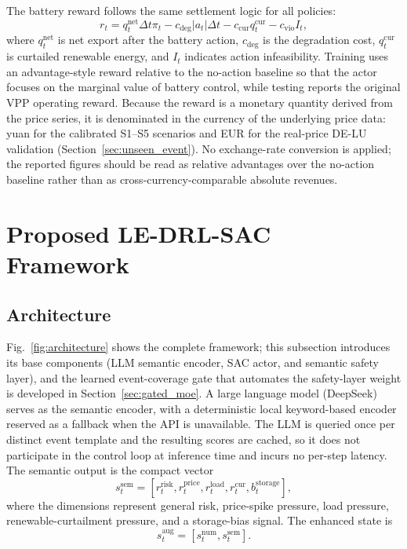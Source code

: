 \documentclass{ieeeaccess}
\begin{document}
The battery reward follows the same settlement logic for all policies:
\begin{equation}
r_t = q^{\mathrm{net}}_t \Delta t \pi_t
- c_{\mathrm{deg}} |a_t| \Delta t
- c_{\mathrm{cur}} q^{\mathrm{cur}}_t
- c_{\mathrm{vio}} I_t ,
\end{equation}
where $q^{\mathrm{net}}_t$ is net export after the battery action, $c_{\mathrm{deg}}$ is the degradation cost, $q^{\mathrm{cur}}_t$ is curtailed renewable energy, and $I_t$ indicates action infeasibility. Training uses an advantage-style reward relative to the no-action baseline so that the actor focuses on the marginal value of battery control, while testing reports the original VPP operating reward. Because the reward is a monetary quantity derived from the price series, it is denominated in the currency of the underlying price data: yuan for the calibrated S1--S5 scenarios and EUR for the real-price DE-LU validation (Section~\ref{sec:unseen_event}). No exchange-rate conversion is applied; the reported figures should be read as relative advantages over the no-action baseline rather than as cross-currency-comparable absolute revenues.

\section{Proposed LE-DRL-SAC Framework}
\label{sec:method}

\subsection{Architecture}
Fig.~\ref{fig:architecture} shows the complete framework; this subsection introduces its base components (LLM semantic encoder, SAC actor, and semantic safety layer), and the learned event-coverage gate that automates the safety-layer weight is developed in Section~\ref{sec:gated_moe}. A large language model (DeepSeek) serves as the semantic encoder, with a deterministic local keyword-based encoder reserved as a fallback when the API is unavailable. The LLM is queried once per distinct event template and the resulting scores are cached, so it does not participate in the control loop at inference time and incurs no per-step latency. The semantic output is the compact vector
\begin{equation}
s^{\mathrm{sem}}_t =
[r_t^{\mathrm{risk}}, r_t^{\mathrm{price}}, r_t^{\mathrm{load}},
r_t^{\mathrm{cur}}, b_t^{\mathrm{storage}}],
\end{equation}
where the dimensions represent general risk, price-spike pressure, load pressure, renewable-curtailment pressure, and a storage-bias signal. The enhanced state is
\begin{equation}
s^{\mathrm{aug}}_t = [s^{\mathrm{num}}_t, s^{\mathrm{sem}}_t].
\end{equation}
\end{document}
